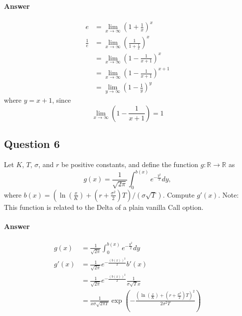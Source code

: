 \paragraph{Answer}
\begin{align*}
    e &= \lim_{x \rightarrow \infty} \left( 1 + \frac{1}{x} \right)^x \\
    \frac{1}{e}
        &= \lim_{x \rightarrow \infty} \left( \frac{1}{1 + \frac{1}{x}}
            \right)^x \\
        &= \lim_{x \rightarrow \infty} \left( 1 - \frac{1}{x + 1} \right)^x \\
        &= \lim_{x \rightarrow \infty} \left( 1 - \frac{1}{x + 1}
            \right)^{x + 1} \\
        &= \lim_{y \rightarrow \infty} \left( 1 - \frac{1}{y} \right)^y
\end{align*}
where $ y = x + 1 $, since
\begin{equation*}
    \lim_{x \rightarrow \infty} \left( 1 - \frac{1}{x + 1} \right) = 1
\end{equation*}

\subsection{Question 6}
Let $ K $, $ T $, $ \sigma $, and $ r $ be positive constants, and define the
    function $ g : \mathbb{R} \rightarrow \mathbb{R} $ as
\begin{equation*}
    g (x) = \frac{1}{\sqrt{2 \pi}} \int_{0}^{b (x)} e^{-\frac{y^2}{2}} dy,
\end{equation*}
where $ b (x) = (\ln (\frac{x}{K}) + (r + \frac{\sigma^2}{2}) T) /
    (\sigma \sqrt{T}) $.
Compute $ g'(x) $.
Note: This function is related to the Delta of a plain vanilla Call option.

\paragraph{Answer}
\begin{align*}
    g(x) &= \frac{1}{\sqrt{2 \pi}} \int_{0}^{b (x)} e^{-\frac{y^2}{2}} dy \\
    g'(x)
        &= \frac{1}{\sqrt{2 \pi}} e^{-\frac{(b(x))^2}{2}} b'(x) \\
        &= \frac{1}{\sqrt{2 \pi}} e^{-\frac{(b(x))^2}{2}}
            \frac{1}{\sigma \sqrt{T} x} \\
        &= \frac{1}{x \sigma \sqrt{2 \pi T}} \exp \left( -\frac{\left(
            \ln \left( \frac{x}{K} \right) + \left( r + \frac{\sigma^2}{2}
            \right) T \right)^2}{2 \sigma^2 T} \right)
\end{align*}


